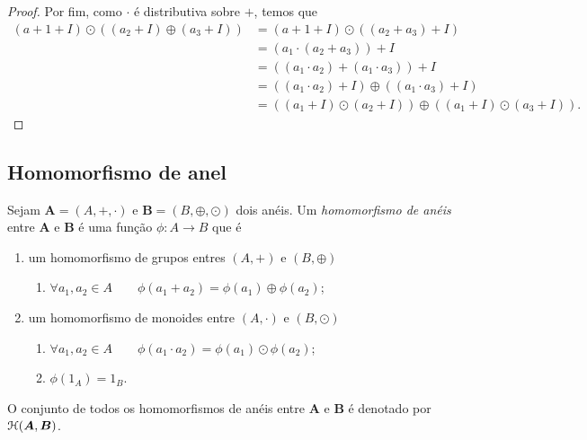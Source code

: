 \begin{proof}
	Por fim, como $\cdot$ é distributiva sobre $+$, temos que
	\begin{align*}
	(a+1+I)\odot((a_2+I)\oplus(a_3+I)) &= (a+1+I)\odot((a_2+a_3)+I) \\
		&= (a_1 \cdot (a_2+a_3))+I \\
		&= ((a_1 \cdot a_2) + (a_1 \cdot a_3))+I \\
		&= ((a_1 \cdot a_2)+I) \oplus ((a_1 \cdot a_3)+I) \\
		&= ((a_1+I)\odot(a_2+I))\oplus((a_1+I)\odot(a_3+I)).
	\end{align*}
\end{proof}

\subsection{Homomorfismo de anel}

\begin{definition}
	Sejam $\bm A=(A,+,\cdot)$ e $\bm B=(B,\oplus,\odot)$ dois anéis. Um \emph{homomorfismo de anéis} entre $\bm A$ e $\bm B$ é uma função $\phi: A \to B$ que é
	\begin{enumerate}
	\item um homomorfismo de grupos entres $(A,+)$ e $(B,\oplus)$
		\begin{enumerate}
		\item $\forall a_1,a_2 \in A \qquad \phi(a_1 + a_2) = \phi(a_1) \oplus \phi(a_2)$;
		\end{enumerate}
	\item um homomorfismo de monoides entre $(A,\cdot)$ e $(B,\odot)$
		\begin{enumerate}
		\item $\forall a_1,a_2 \in A \qquad \phi(a_1 \cdot a_2) = \phi(a_1) \odot \phi(a_2)$;
		\item $\phi(1_A)=1_B$.
		\end{enumerate}
	\end{enumerate}

	O conjunto de todos os homomorfismos de anéis entre $\bm A$ e $\bm B$ é denotado por $\mathcal{H}(\bm A,\bm B)$.
\end{definition}

